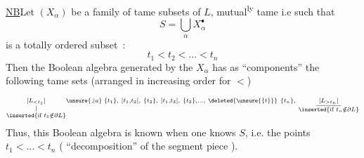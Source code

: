 \uline{NB}\qquad Let $(X_\alpha)$ be a  family of tame subsets of $L$,  mutual\textsuperscript{ly} tame i.e such that
\[
S=\bigcup_\alpha X_\alpha^{\bullet}
\]
is a totally ordered subset~:
\[
t_1<t_2<\ldots<t_n
\]
Then the Boolean algebra generated by the $X_\alpha$  has as   ``components'' the following tame sets  (arranged in increasing order for $<$)
\[
\scriptstyle
\underset{\substack{\vert\\\inserted{\text{if }t_1\notin\partial L}}}{[L_{<t_1}]}\unsure{,|a}\;
\{t_1\},\ ]t_1,t_2[,\ \{t_2\},\ ]t_{1},t_3[,\ \{t_3\},\ldots,\
\deleted{\unsure{\{t\}}}\ \{t_n\},\
\underset{\substack{\rule{3em}{0.35pt}\\\inserted{\text{if }t_n\notin\partial L}}}{[L_{>t_n}]}
\]
Thus, this Boolean algebra is known when one knows $S$, i.e. the points $t_1<\ldots<t_n$ ( ``decomposition''  of the segment piece ).

